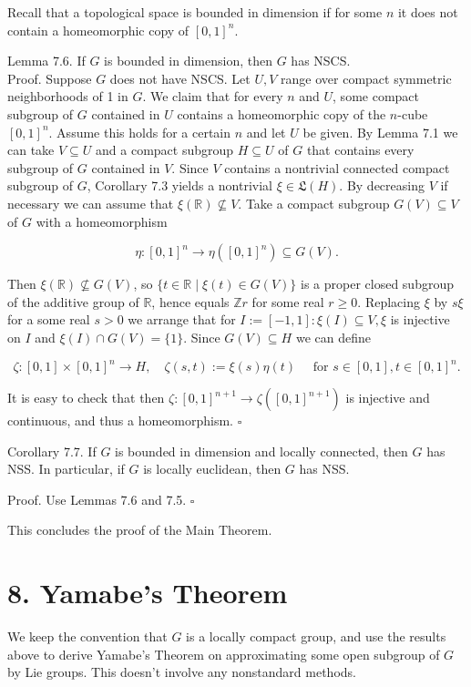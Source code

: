 \documentclass[10pt]{article}
\begin{document}
Recall that a topological space is bounded in dimension if for some $n$ it does not contain a homeomorphic copy of $[0,1]^{n}$.

Lemma 7.6. If $G$ is bounded in dimension, then $G$ has NSCS.\\
Proof. Suppose $G$ does not have NSCS. Let $U, V$ range over compact symmetric neighborhoods of 1 in $G$. We claim that for every $n$ and $U$, some compact\\
subgroup of $G$ contained in $U$ contains a homeomorphic copy of the $n$-cube $[0,1]^{n}$. Assume this holds for a certain $n$ and let $U$ be given. By Lemma 7.1 we can take $V \subseteq U$ and a compact subgroup $H \subseteq U$ of $G$ that contains every subgroup of $G$ contained in $V$. Since $V$ contains a nontrivial connected compact subgroup of $G$, Corollary 7.3 yields a nontrivial $\xi \in \mathfrak{L}(H)$. By decreasing $V$ if necessary we can assume that $\xi(\mathbb{R}) \nsubseteq V$. Take a compact subgroup $G(V) \subseteq V$ of $G$ with a homeomorphism

$$
\eta:[0,1]^{n} \rightarrow \eta\left([0,1]^{n}\right) \subseteq G(V) .
$$

Then $\xi(\mathbb{R}) \nsubseteq G(V)$, so $\{t \in \mathbb{R} \mid \xi(t) \in G(V)\}$ is a proper closed subgroup of the additive group of $\mathbb{R}$, hence equals $\mathbb{Z} r$ for some real $r \geq 0$. Replacing $\xi$ by $s \xi$ for a some real $s>0$ we arrange that for $I:=[-1,1]: \xi(I) \subseteq V, \xi$ is injective on $I$ and $\xi(I) \cap G(V)=\{1\}$. Since $G(V) \subseteq H$ we can define

$$
\zeta:[0,1] \times[0,1]^{n} \rightarrow H, \quad \zeta(s, t):=\xi(s) \eta(t) \quad \text { for } s \in[0,1], t \in[0,1]^{n} .
$$

It is easy to check that then $\zeta:[0,1]^{n+1} \rightarrow \zeta\left([0,1]^{n+1}\right)$ is injective and continuous, and thus a homeomorphism. \(\square\)

Corollary 7.7. If $G$ is bounded in dimension and locally connected, then $G$ has NSS. In particular, if $G$ is locally euclidean, then $G$ has NSS.

Proof. Use Lemmas 7.6 and 7.5. \(\square\)

This concludes the proof of the Main Theorem.

\section*{8. Yamabe's Theorem}
We keep the convention that $G$ is a locally compact group, and use the results above to derive Yamabe's Theorem on approximating some open subgroup of $G$ by Lie groups. This doesn't involve any nonstandard methods.
\end{document}
